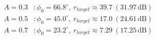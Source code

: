 \documentclass[border=1pt]{standalone}
\begin{document}
\fontsize{14}{16.8}\selectfont
\(\displaystyle \begin{aligned} A=0.3 &: \phi_0=66.8^\circ,\ r_{target}\approx 39.7\ (31.97\,\text{dB}) \\ A=0.5 &: \phi_0=45.0^\circ,\ r_{target}\approx 17.0\ (24.61\,\text{dB}) \\ A=0.7 &: \phi_0=23.2^\circ,\ r_{target}\approx 7.29\ (17.25\,\text{dB}) \end{aligned}\)
\end{document}
